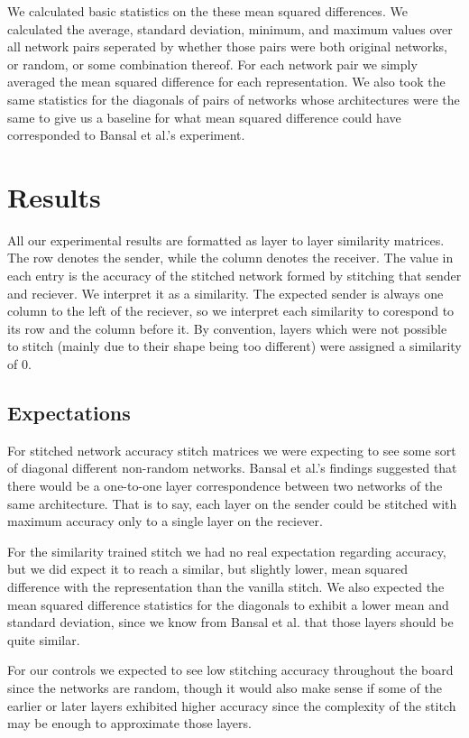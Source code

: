 \documentclass{article} %
\begin{document}
We calculated basic statistics on the these mean squared differences. We calculated the average, standard deviation, minimum,
and maximum values over all network pairs seperated by whether those pairs were both original networks, or random, or some
combination thereof. For each network pair we simply averaged the mean squared difference for each representation.
We also took the same statistics for the diagonals of pairs of networks whose architectures were the
same to give us a baseline for what mean squared difference could have corresponded to Bansal et al.'s
experiment.

\section{Results}
\label{Results}
All our experimental results are formatted as layer to
layer similarity matrices. The row denotes the sender, while the column denotes the receiver.
The value in each entry is the accuracy of the stitched network formed by stitching that sender
and reciever. We interpret it as a similarity.
The expected sender is always one column to the left of the reciever, so we interpret each similarity
to corespond to its row and the column before it. By convention, layers which were not possible to stitch
(mainly due to their shape being too different) were assigned a similarity of 0.

\subsection*{Expectations}
For stitched network accuracy stitch matrices we were expecting to see some sort of diagonal
different non-random networks. Bansal et al.'s findings suggested that there would be a one-to-one layer correspondence between
two networks of the same architecture. That is to say, each layer on the sender could be stitched with maximum
accuracy only to a single layer on the reciever.

For the similarity trained stitch we had no real expectation regarding accuracy, but we did expect it to reach a similar, but
slightly lower, mean squared difference with the representation than the vanilla stitch. We also expected the mean squared
difference statistics for the diagonals to exhibit a lower mean and standard deviation, since we know from Bansal et al. that
those layers should be quite similar.

For our controls we expected to see low stitching accuracy throughout the board since the networks are random, though
it would also make sense if some of the earlier or later layers exhibited higher accuracy since the complexity of the stitch
may be enough to approximate those layers.
\end{document}
